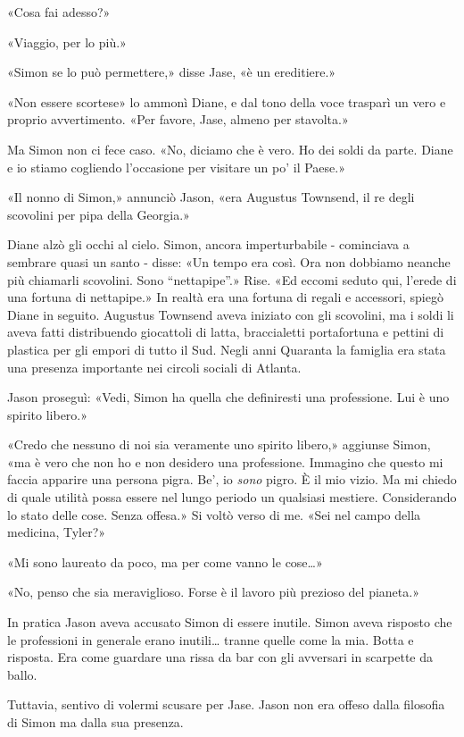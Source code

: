 «Cosa fai adesso?»

«Viaggio, per lo più.»

«Simon se lo può permettere,» disse Jase, «è un ereditiere.»

«Non essere scortese» lo ammonì Diane, e dal tono della voce trasparì un
vero e proprio avvertimento. «Per favore, Jase, almeno per stavolta.»

Ma Simon non ci fece caso. «No, diciamo che è vero. Ho dei soldi da
parte. Diane e io stiamo cogliendo l'occasione per visitare un po' il
Paese.»

«Il nonno di Simon,» annunciò Jason, «era Augustus Townsend, il re degli
scovolini per pipa della Georgia.»

Diane alzò gli occhi al cielo. Simon, ancora imperturbabile - cominciava
a sembrare quasi un santo - disse: «Un tempo era così. Ora non dobbiamo
neanche più chiamarli scovolini. Sono ``nettapipe''.» Rise. «Ed eccomi
seduto qui, l'erede di una fortuna di nettapipe.» In realtà era una
fortuna di regali e accessori, spiegò Diane in seguito. Augustus
Townsend aveva iniziato con gli scovolini, ma i soldi li aveva fatti
distribuendo giocattoli di latta, braccialetti portafortuna e pettini di
plastica per gli empori di tutto il Sud. Negli anni Quaranta la famiglia
era stata una presenza importante nei circoli sociali di Atlanta.

Jason proseguì: «Vedi, Simon ha quella che definiresti una professione.
Lui è uno spirito libero.»

«Credo che nessuno di noi sia veramente uno spirito libero,» aggiunse
Simon, «ma è vero che non ho e non desidero una professione. Immagino
che questo mi faccia apparire una persona pigra. Be', io \emph{sono}
pigro. È il mio vizio. Ma mi chiedo di quale utilità possa essere nel
lungo periodo un qualsiasi mestiere. Considerando lo stato delle cose.
Senza offesa.» Si voltò verso di me. «Sei nel campo della medicina,
Tyler?»

«Mi sono laureato da poco, ma per come vanno le cose\ldots»

«No, penso che sia meraviglioso. Forse è il lavoro più prezioso del
pianeta.»

In pratica Jason aveva accusato Simon di essere inutile. Simon aveva
risposto che le professioni in generale erano inutili\ldots{} tranne
quelle come la mia. Botta e risposta. Era come guardare una rissa da bar
con gli avversari in scarpette da ballo.

Tuttavia, sentivo di volermi scusare per Jase. Jason non era offeso
dalla filosofia di Simon ma dalla sua presenza.

